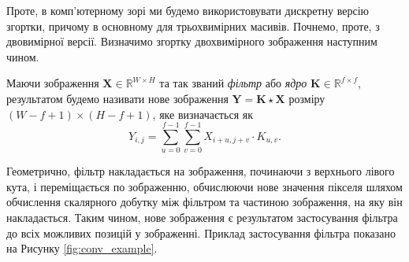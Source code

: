 Проте, в комп'ютерному зорі ми будемо використовувати дискретну версію згортки,
причому в основному для трьохвимірних масивів. Почнемо, проте, з двовимірної
версії. Визначимо згортку двохвимірного зображення наступним чином.
\begin{definition}
    Маючи зображення $\boldsymbol{X} \in \mathbb{R}^{W \times H}$ та так званий
    \textit{фільтр} або \textit{ядро} $\boldsymbol{K} \in \mathbb{R}^{f \times
    f}$, результатом будемо називати нове зображення
    $\boldsymbol{Y}=\boldsymbol{K} \star \boldsymbol{X}$ розміру $(W-f+1) \times
    (H-f+1)$, яке визначається як
    \begin{equation}
        Y_{i,j} = \sum_{u=0}^{f-1} \sum_{v=0}^{f-1} X_{i+u,j+v} \cdot K_{u,v}.
    \end{equation}
\end{definition}

Геометрично, фільтр накладається на зображення, починаючи з верхнього лівого
кута, і переміщається по зображенню, обчислюючи нове значення пікселя шляхом
обчислення скалярного добутку між фільтром та частиною зображення, на яку
він накладається. Таким чином, нове зображення є результатом застосування
фільтра до всіх можливих позицій у зображенні. Приклад застосування фільтра показано 
на Рисунку \ref{fig:conv_example}.

